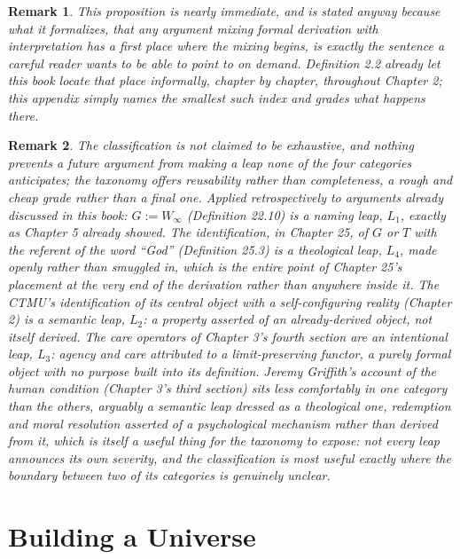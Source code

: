 \documentclass[11pt]{book}
\newtheorem*{appendixremark}{Remark}
\begin{document}
\begin{appendixremark}
This proposition is nearly immediate, and is stated anyway because what it formalizes, that any argument mixing formal derivation with interpretation has a first place where the mixing begins, is exactly the sentence a careful reader wants to be able to point to on demand. Definition 2.2 already let this book locate that place informally, chapter by chapter, throughout Chapter 2; this appendix simply names the smallest such index and grades what happens there.
\end{appendixremark}

\begin{appendixremark}
The classification is not claimed to be exhaustive, and nothing prevents a future argument from making a leap none of the four categories anticipates; the taxonomy offers reusability rather than completeness, a rough and cheap grade rather than a final one. Applied retrospectively to arguments already discussed in this book: $G := W_\infty$ (Definition 22.10) is a naming leap, $L_1$, exactly as Chapter 5 already showed. The identification, in Chapter 25, of $G$ or $T$ with the referent of the word ``God'' (Definition 25.3) is a theological leap, $L_4$, made openly rather than smuggled in, which is the entire point of Chapter 25's placement at the very end of the derivation rather than anywhere inside it. The CTMU's identification of its central object with a self-configuring reality (Chapter 2) is a semantic leap, $L_2$: a property asserted of an already-derived object, not itself derived. The care operators of Chapter 3's fourth section are an intentional leap, $L_3$: agency and care attributed to a limit-preserving functor, a purely formal object with no purpose built into its definition. Jeremy Griffith's account of the human condition (Chapter 3's third section) sits less comfortably in one category than the others, arguably a semantic leap dressed as a theological one, redemption and moral resolution asserted of a psychological mechanism rather than derived from it, which is itself a useful thing for the taxonomy to expose: not every leap announces its own severity, and the classification is most useful exactly where the boundary between two of its categories is genuinely unclear.
\end{appendixremark}

\part{Building a Universe}
\end{document}
